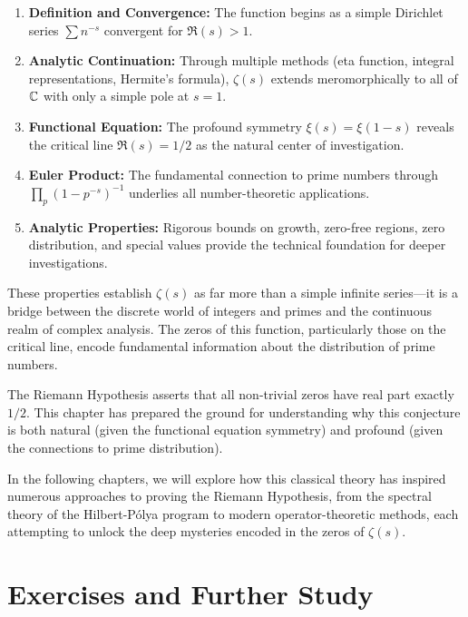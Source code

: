 \begin{enumerate}
\item \textbf{Definition and Convergence:} The function begins as a simple Dirichlet series $\sum n^{-s}$ convergent for $\Re(s) > 1$.

\item \textbf{Analytic Continuation:} Through multiple methods (eta function, integral representations, Hermite's formula), $\zeta(s)$ extends meromorphically to all of $\mathbb{C}$ with only a simple pole at $s = 1$.

\item \textbf{Functional Equation:} The profound symmetry $\xi(s) = \xi(1-s)$ reveals the critical line $\Re(s) = 1/2$ as the natural center of investigation.

\item \textbf{Euler Product:} The fundamental connection to prime numbers through $\prod_p (1-p^{-s})^{-1}$ underlies all number-theoretic applications.

\item \textbf{Analytic Properties:} Rigorous bounds on growth, zero-free regions, zero distribution, and special values provide the technical foundation for deeper investigations.
\end{enumerate}

These properties establish $\zeta(s)$ as far more than a simple infinite series—it is a bridge between the discrete world of integers and primes and the continuous realm of complex analysis. The zeros of this function, particularly those on the critical line, encode fundamental information about the distribution of prime numbers.

\begin{highlight}
The Riemann Hypothesis asserts that all non-trivial zeros have real part exactly $1/2$. This chapter has prepared the ground for understanding why this conjecture is both natural (given the functional equation symmetry) and profound (given the connections to prime distribution).
\end{highlight}

In the following chapters, we will explore how this classical theory has inspired numerous approaches to proving the Riemann Hypothesis, from the spectral theory of the Hilbert-Pólya program to modern operator-theoretic methods, each attempting to unlock the deep mysteries encoded in the zeros of $\zeta(s)$.

\section{Exercises and Further Study}
\label{sec:exercises}

